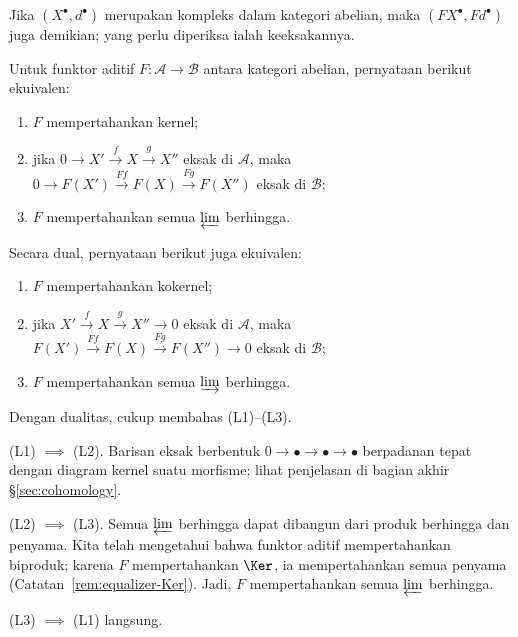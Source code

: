 Jika $(X^\bullet,d^\bullet)$ merupakan kompleks dalam kategori abelian, maka
$(FX^\bullet,Fd^\bullet)$ juga demikian; yang perlu diperiksa ialah
keeksakannya.

\begin{proposisi}\label{prop:left-right-exact-functor}
Untuk funktor aditif $F:\mathcal{A}\to\mathcal{B}$ antara kategori abelian,
pernyataan berikut ekuivalen:
\begin{enumerate}[(L1)]
	\item $F$ mempertahankan kernel;
	\item jika $0\to X'\xrightarrow{f}X\xrightarrow{g}X''$ eksak di $\mathcal{A}$,
	maka $0\to F(X')\xrightarrow{Ff}F(X)\xrightarrow{Fg}F(X'')$ eksak di $\mathcal{B}$;
	\item $F$ mempertahankan semua $\varprojlim$ berhingga.
\end{enumerate}
Secara dual, pernyataan berikut juga ekuivalen:
\begin{enumerate}[(R1)]
	\item $F$ mempertahankan kokernel;
	\item jika $X'\xrightarrow{f}X\xrightarrow{g}X''\to0$ eksak di $\mathcal{A}$,
	maka $F(X')\xrightarrow{Ff}F(X)\xrightarrow{Fg}F(X'')\to0$ eksak di $\mathcal{B}$;
	\item $F$ mempertahankan semua $\varinjlim$ berhingga.
\end{enumerate}
\end{proposisi}

\begin{bukti}
Dengan dualitas, cukup membahas (L1)--(L3).

(L1) $\implies$ (L2). Barisan eksak berbentuk
$0\to\bullet\to\bullet\to\bullet$ berpadanan tepat dengan diagram kernel suatu morfisme;
lihat penjelasan di bagian akhir \S\ref{sec:cohomology}.

(L2) $\implies$ (L3). Semua $\varprojlim$ berhingga dapat dibangun dari produk
berhingga dan penyama. Kita telah mengetahui bahwa funktor aditif
mempertahankan biproduk; karena $F$ mempertahankan $\Ker$, ia mempertahankan
semua penyama (Catatan~\ref{rem:equalizer-Ker}). Jadi, $F$ mempertahankan semua
$\varprojlim$ berhingga.

(L3) $\implies$ (L1) langsung.
\end{bukti}

